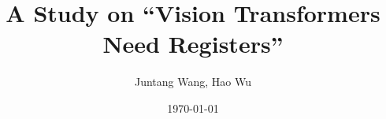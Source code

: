 \title%
[ViT-RGTS]%
{A Study on ``Vision Transformers Need Registers''}%

\author%
[Juntang Wang]%
{%
  Juntang Wang\footnotemark[1], 
  Hao Wu\footnotemark[2] 
}


\date%
[\today]%
{\today}
